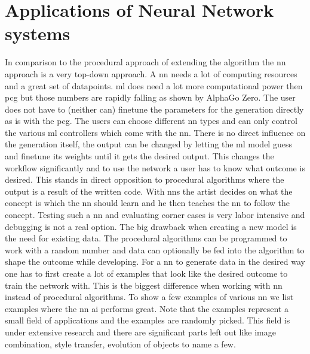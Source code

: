 \documentclass[10pt,a4paper]{article}
\begin{document}
\section{Applications of Neural Network systems}
In comparison to the procedural approach of extending the algorithm the \gls{nn} approach is a very top-down approach. A \gls{nn} needs a lot of computing resources and a great set of datapoints. \gls{ml} does need a lot more computational power then \gls{pcg} but those numbers are rapidly falling as shown by AlphaGo Zero\citep{Silver2017}. The user does not have to (neither can) finetune the parameters for the generation directly as is with the \gls{pcg}. The users can choose different \gls{nn} types and can only control the various \gls{ml} controllers which come with the \gls{nn}. There is no direct influence on the generation itself, the output can be changed by letting the \gls{ml} model guess and finetune its weights until it gets the desired output. This changes the workflow significantly and to use the network a user has to know what outcome is desired. This stands in direct opposition to procedural algorithms where the output is a result of the written code. With \gls{nn}s the artist decides on what the concept is which the \gls{nn} should learn and he then teaches the \gls{nn} to follow the concept. Testing such a \gls{nn} and evaluating corner cases is very labor intensive and debugging is not a real option. The big drawback when creating a new model is the need for existing data. The procedural algorithms can be programmed to work with a random number and data can optionally be fed into the algorithm to shape the outcome while developing. For a \gls{nn} to generate data in the desired way one has to first create a lot of examples that look like the desired outcome to train the network with. This is the biggest difference when working with \gls{nn} instead of procedural algorithms. To show a few examples of various \gls{nn} we list examples where the \gls{nn} \gls{ai} performs great. Note that the examples represent a small field of applications and the examples are randomly picked. This field is under extensive research and there are significant parts left out like image combination\cite{Luan2018}, style transfer, evolution of objects to name a few.
\end{document}
